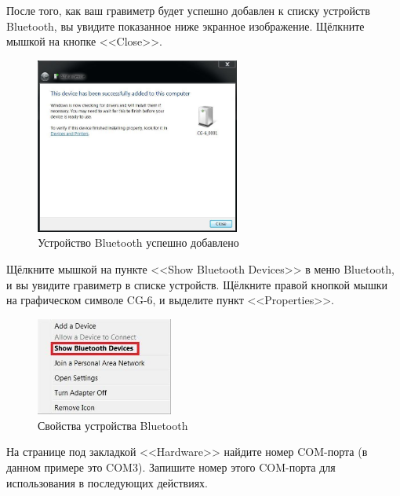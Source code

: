 После того, как ваш гравиметр \cg{} будет успешно добавлен к списку устройств
Bluetooth, вы увидите показанное ниже экранное изображение.  Щёлкните мышкой на
кнопке <<Close>>.

\begin{figure}[H]
  \centering
  \includegraphics[width=0.6\textwidth]{figures/bluetooth_device_successfully_added}
  \caption{Устройство Bluetooth успешно добавлено}
  \label{fig:bluetooth_device_successfully_added}
\end{figure}

Щёлкните мышкой на пункте <<Show Bluetooth Devices>> в меню Bluetooth, и вы
увидите гравиметр \cg{} в списке устройств. Щёлкните правой кнопкой мышки на
графическом символе CG-6, и выделите пункт <<Properties>>.

\begin{figure}[H]
  \centering
  \includegraphics[width=0.4\textwidth]{figures/bluetooth_device_properties}
  \caption{Свойства устройства Bluetooth}
  \label{fig:bluetooth_device_properties}
\end{figure}


На странице под закладкой <<Hardware>> найдите номер COM-порта (в данном примере
это COM3). Запишите номер этого COM-порта для использования в последующих
действиях.

